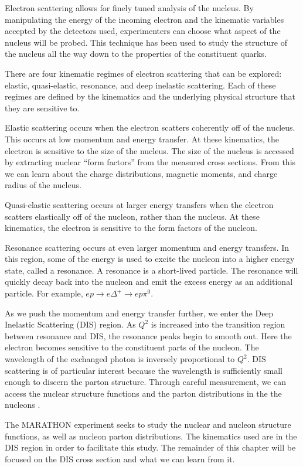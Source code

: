 Electron scattering allows for finely tuned analysis of the nucleus. By manipulating the energy of the incoming electron and the kinematic variables accepted by the detectors used, experimenters can choose what aspect of the nucleus will be probed. This technique has been used to study the structure of the nucleus all the way down to the properties of the constituent quarks.

There are four kinematic regimes of electron scattering that can be explored: elastic, quasi-elastic, resonance, and deep inelastic scattering. Each of these regimes are defined by the kinematics and the underlying physical structure that they are sensitive to.

Elastic scattering occurs when the electron scatters coherently off of the nucleus. This occurs at low momentum and energy transfer. At these kinematics, the electron is sensitive to the size of the nucleus. The size of the nucleus is accessed by extracting nuclear ``form factors'' from the measured cross sections. From this we can learn about the charge distributions, magnetic moments, and charge radius of the nucleus.

Quasi-elastic scattering occurs at larger energy transfers when the electron scatters elastically off of the nucleon, rather than the nucleus. At these kinematics, the electron is sensitive to the form factors of the nucleon.

Resonance scattering occurs at even larger momentum and energy transfers. In this region, some of the energy is used to excite the nucleon into a higher energy state, called a resonance. A resonance is a short-lived particle. The resonance will quickly decay back into the nucleon and emit the excess energy as an additional particle. For example, $ep \rightarrow e\Delta^+ \rightarrow ep\pi^0$.

As we push the momentum and energy transfer further, we enter the Deep Inelastic Scattering (DIS) region. As $Q^2$ is increased into the transition region between resonance and DIS, the resonance peaks begin to smooth out. Here the electron becomes sensitive to the constituent parts of the nucleon. The wavelength of the exchanged photon is inversely proportional to $Q^2$. DIS scattering is of particular interest because the wavelength is sufficiently small enough to discern the parton structure. Through careful measurement, we can access the nuclear structure functions and the parton distributions in the the nucleons \cite{HaM,PaN,NaPP}.

The MARATHON experiment seeks to study the nuclear and nucleon structure functions, as well as nucleon parton distributions. The kinematics used are in the DIS region in order to facilitate this study. The remainder of this chapter will be focused on the DIS cross section and what we can learn from it.

